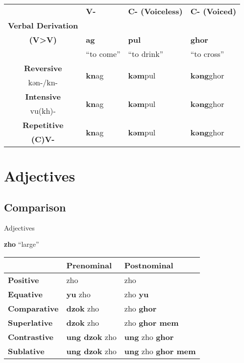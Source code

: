 \documentclass[oneside]{book}
\begin{document}
\begin{center}
\begin{tabular}{|c|l|l|l|}\hline
&\textbf{V-}&\textbf{C- (Voiceless)}&\textbf{C- (Voiced)}\\
\textbf{Verbal Derivation}&&&\\\cline{2-4}
\textbf{(V>V)}&\textbf{ag}&\textbf{pul}&\textbf{ghor}\\
&``to come''&``to drink''&``to cross''\\\hline
\textbf{Reversive}&\multirow{2}{*}{\textbf{kn}ag}&\multirow{2}{*}{\textbf{kǝm}pul}&\multirow{2}{*}{\textbf{kǝng}ghor}\\\cline{1-1}
kǝn-/kn-&&&\\\hline
\textbf{Intensive}&\multirow{2}{*}{\textbf{kn}ag}&\multirow{2}{*}{\textbf{kǝm}pul}&\multirow{2}{*}{\textbf{kǝng}ghor}\\\cline{1-1}
vu(kh)-&&&\\\hline
\textbf{Repetitive}&\multirow{2}{*}{\textbf{kn}ag}&\multirow{2}{*}{\textbf{kǝm}pul}&\multirow{2}{*}{\textbf{kǝng}ghor}\\\cline{1-1}
\textbf{(C)V-}&&&\\\hline
\end{tabular}
\end{center}

\section{Adjectives}

\subsection{Comparison}

Adjectives

\textbf{zho} ``large''

\begin{center}
\begin{tabular}{|l|l|l|}\hline
&\textbf{Prenominal}&\textbf{Postnominal}\\\hline
\textbf{Positive}&zho&zho\\\hline
\textbf{Equative}&\textbf{yu} zho&zho \textbf{yu}\\\hline
\textbf{Comparative}&\textbf{dzok} zho&zho \textbf{ghor}\\\hline
\textbf{Superlative}&\textbf{dzok} zho&zho \textbf{ghor mem}\\\hline
\textbf{Contrastive}&\textbf{ung dzok} zho&\textbf{ung} zho \textbf{ghor}\\\hline
\textbf{Sublative}&\textbf{ung dzok} zho&\textbf{ung} zho \textbf{ghor mem}\\\hline
\end{tabular}
\end{center}
\end{document}
